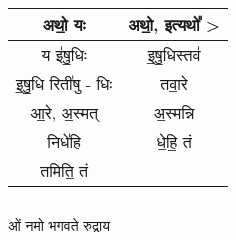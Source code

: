 {\centering
{\small {}} \\
\begin{longtable}{|c|c|}
\hline
अथो॒ यः                   & अथो॒, इत्यथो᳚ >\\
\hline
य इ॑षु॒धिः                  & इ॒षु॒धिस्तव॑\\
\hline
इ॒षु॒धि रिती॑षु - धिः          & तवा॒रे\\
\hline
आ॒रे, अ॒स्मत्                  & अ॒स्मन्नि\\
\hline
निधे॑हि                    & धे॒हि॒ तं\\
\hline
तमिति॒ तं                  & \\
\hline
\end{longtable}
}
\subsection{}
ओं नमो भगवते रुद्राय
